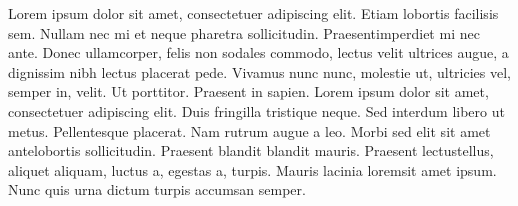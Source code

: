 Lorem ipsum dolor sit amet, consectetuer adipiscing elit. Etiam lobortis facilisis sem. Nullam nec mi et neque pharetra sollicitudin. Praesentimperdiet mi nec ante. Donec ullamcorper, felis non sodales commodo, lectus velit ultrices augue, a dignissim nibh lectus placerat pede. Vivamus nunc nunc, molestie ut, ultricies vel, semper in, velit. Ut porttitor. Praesent in sapien. Lorem ipsum dolor sit amet, consectetuer adipiscing elit. Duis fringilla tristique neque. Sed interdum libero ut metus. Pellentesque placerat. Nam rutrum augue a leo. Morbi sed elit sit amet antelobortis sollicitudin. Praesent blandit blandit mauris. Praesent lectustellus, aliquet aliquam, luctus a, egestas a, turpis. Mauris lacinia loremsit amet ipsum. Nunc quis urna dictum turpis accumsan semper.

